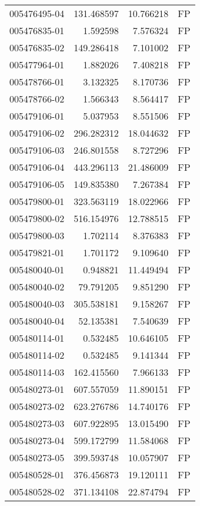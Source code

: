 \begin{tabular}{lrrl}
005476495-04 &  131.468597 &    10.766218 &   FP \\
005476835-01 &    1.592598 &     7.576324 &   FP \\
005476835-02 &  149.286418 &     7.101002 &   FP \\
005477964-01 &    1.882026 &     7.408218 &   FP \\
005478766-01 &    3.132325 &     8.170736 &   FP \\
005478766-02 &    1.566343 &     8.564417 &   FP \\
005479106-01 &    5.037953 &     8.551506 &   FP \\
005479106-02 &  296.282312 &    18.044632 &   FP \\
005479106-03 &  246.801558 &     8.727296 &   FP \\
005479106-04 &  443.296113 &    21.486009 &   FP \\
005479106-05 &  149.835380 &     7.267384 &   FP \\
005479800-01 &  323.563119 &    18.022966 &   FP \\
005479800-02 &  516.154976 &    12.788515 &   FP \\
005479800-03 &    1.702114 &     8.376383 &   FP \\
005479821-01 &    1.701172 &     9.109640 &   FP \\
005480040-01 &    0.948821 &    11.449494 &   FP \\
005480040-02 &   79.791205 &     9.851290 &   FP \\
005480040-03 &  305.538181 &     9.158267 &   FP \\
005480040-04 &   52.135381 &     7.540639 &   FP \\
005480114-01 &    0.532485 &    10.646105 &   FP \\
005480114-02 &    0.532485 &     9.141344 &   FP \\
005480114-03 &  162.415560 &     7.966133 &   FP \\
005480273-01 &  607.557059 &    11.890151 &   FP \\
005480273-02 &  623.276786 &    14.740176 &   FP \\
005480273-03 &  607.922895 &    13.015490 &   FP \\
005480273-04 &  599.172799 &    11.584068 &   FP \\
005480273-05 &  399.593748 &    10.057907 &   FP \\
005480528-01 &  376.456873 &    19.120111 &   FP \\
005480528-02 &  371.134108 &    22.874794 &   FP \\

\end{tabular}
